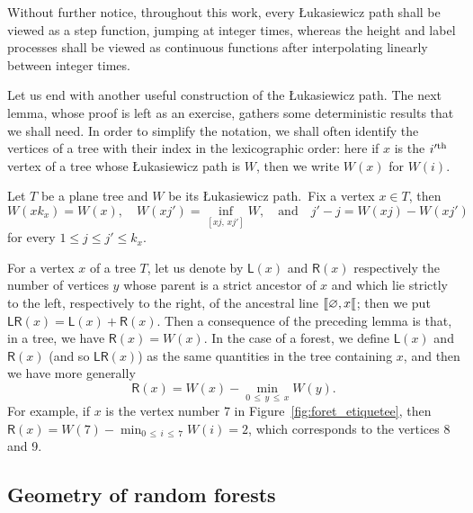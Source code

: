 \documentclass[AHL,Unicode,longabstracts,published]{cedram}
\newcommand{\llbracket}{\mathopen{[\mkern -2.7mu[}}
\newcommand{\1}{\ensembles{1}}
\renewcommand{\le}{\leqslant}
\newcommand{\LL}{\mathsf{L}}
\newcommand{\RR}{\mathsf{R}}
\newcommand{\LR}{\mathsf{LR}}
\begin{document}
Without further notice, throughout this work, every {\L}ukasiewicz path shall be viewed as a step function, jumping at integer times, whereas the height and label processes shall be viewed as continuous functions after interpolating linearly between integer times.


Let us end with another useful construction of the {\L}ukasiewicz path. The next lemma, whose proof is left as an exercise, gathers some deterministic results that we shall need. In order to simplify the notation, we shall often identify the vertices of a tree with their index in the lexicographic order: here if $x$ is the $i'^{\rm th}$ vertex of a tree whose {\L}ukasiewicz path is $W$, then we write $W(x)$ for $W(i)$.

\begin{lemm}\label{lem:codage_marche_Luka}
Let $T$ be a plane tree and $W$ be its {\L}ukasiewicz path.~Fix a vertex $x \in T$, then
\[
W(x k_x) = W(x),
\quad W(xj') = \inf_{\left[xj,\,xj'\right]} W,
\quad\text{and}\quad j' - j = W(xj) - W(xj')
\]
for every $1 \le j \le j' \le k_x$.
\end{lemm}



For a vertex $x$ of a tree $T$, let us denote by $\LL(x)$ and $\RR(x)$ respectively the number of vertices $y$ whose parent is a strict ancestor of $x$ and which lie strictly to the left, respectively to the right, of the ancestral line $\llbracket \varnothing, x\llbracket$; then we put $\LR(x) = \LL(x) + \RR(x)$. Then a consequence of the preceding lemma is that, in a tree, we have $\RR(x) = W(x)$. In the case of a forest, we define $\LL(x)$ and $\RR(x)$ (and so $\LR(x)$) as the same quantities in the tree containing $x$, and then we have more generally
\begin{equation}\label{eq:def_X_discret}
\RR(x) = W(x) - \min_{0\,\le\,y\,\le\,x} W(y).
\end{equation}
For example, if $x$ is the vertex number 7 in Figure~\ref{fig:foret_etiquetee}, then $\RR(x) = W(7) - \min_{0\,\le\,i\,\le\,7} W(i) = 2$, which corresponds to the vertices 8 and 9.



\subsection{Geometry of random forests}\label{sec:arbres_etiquetes}
\end{document}
